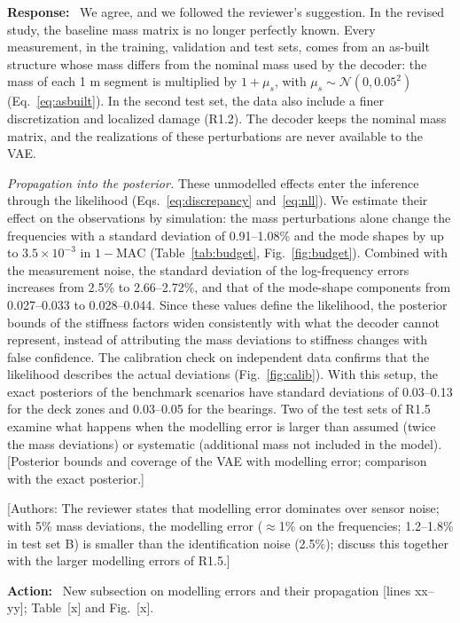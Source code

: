 \documentclass[11pt]{article}
\newenvironment{response}{\par\smallskip\noindent\color{resp}\textbf{Response:}\ }{\par}
\newenvironment{action}{\par\smallskip\noindent\color{resp}\textbf{Action:}\ }{\par}
\newcommand{\authornote}[1]{\textcolor{note}{\textsf{[Authors: #1]}}}
\newcommand{\tbd}[1]{\textcolor{note}{\textsf{[#1]}}}
\newcommand{\lines}[1]{\tbd{lines #1}}
\begin{document}
\begin{response}
We agree, and we followed the reviewer's suggestion. In the revised study, the baseline mass matrix is no longer
perfectly known. Every measurement, in the training, validation and test sets, comes from an as-built structure whose
mass differs from the nominal mass used by the decoder: the mass of each 1 m segment is multiplied by $1+\mu_s$, with
$\mu_s\sim\mathcal{N}(0,0.05^2)$ (Eq.~\eqref{eq:asbuilt}). In the second test set, the data also include a finer discretization and localized damage (R1.2).
The decoder keeps the nominal mass matrix, and the realizations of these perturbations are never available to the VAE.

\textit{Propagation into the posterior.} These unmodelled effects enter the inference through the likelihood
(Eqs.~\eqref{eq:discrepancy} and~\eqref{eq:nll}). We estimate their effect on the observations by simulation: the mass
perturbations alone change the frequencies with a standard deviation of 0.91--1.08\% and the mode shapes by up to
$3.5\times10^{-3}$ in $1-\mathrm{MAC}$ (Table~\ref{tab:budget}, Fig.~\ref{fig:budget}). Combined with the measurement
noise, the standard deviation of the log-frequency errors increases from 2.5\% to 2.66--2.72\%, and that of the
mode-shape components from 0.027--0.033 to 0.028--0.044. Since these values define the likelihood, the posterior bounds of the stiffness
factors widen consistently with what the decoder cannot represent, instead of attributing the mass deviations to
stiffness changes with false confidence. The calibration check on independent data confirms that the likelihood
describes the actual deviations (Fig.~\ref{fig:calib}). With this setup, the exact posteriors of the benchmark scenarios
have standard deviations of 0.03--0.13 for the deck zones and 0.03--0.05 for the bearings. Two of the test sets of R1.5
examine what happens when the modelling error is larger than assumed (twice the mass deviations) or
systematic (additional mass not included in the model).
\tbd{Posterior bounds and coverage of the VAE with modelling error; comparison with the exact posterior.}
\end{response}
\authornote{The reviewer states that modelling error dominates over sensor noise; with 5\% mass deviations, the
modelling error ($\approx$1\% on the frequencies; 1.2--1.8\% in test set B) is smaller than the identification noise (2.5\%); discuss this together with the larger
modelling errors of R1.5.}

\begin{action}
New subsection on modelling errors and their propagation \lines{xx--yy}; Table~\tbd{x} and Fig.~\tbd{x}.
\end{action}
\end{document}
